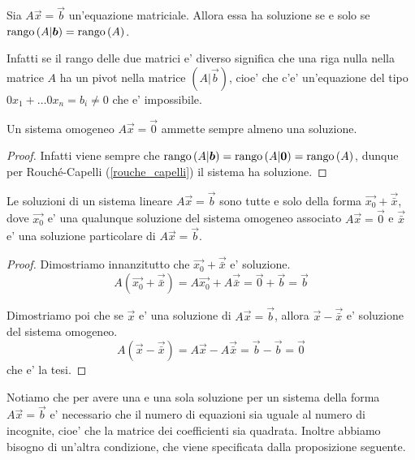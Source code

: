 \begin{theorem} \label{rouche_capelli}
    Sia $A\vec{x} = \vec b$ un'equazione matriciale. Allora essa ha soluzione se e solo se $\operatorname{rango}\left( A|\bm{b} \right) = \operatorname{rango}\left( A \right)$.
\end{theorem}
\begin{intuition}
    Infatti se il rango delle due matrici e' diverso significa che una riga nulla nella matrice $A$ ha un pivot nella matrice $(A|\vec b)$, cioe' che c'e' un'equazione del tipo $0x_1 + \dots 0x_n = b_i \neq 0$ che e' impossibile.
\end{intuition}

\begin{proposition}
    Un sistema omogeneo $A\vec{x} = \vec 0$ ammette sempre almeno una soluzione.
\end{proposition}
\begin{proof}
    Infatti viene sempre che $\operatorname{rango}\left( A|\bm{b} \right) = \operatorname{rango}\left( A|\bm{0} \right) = \operatorname{rango}\left( A \right)$, dunque per Rouché-Capelli (\ref{rouche_capelli}) il sistema ha soluzione.
\end{proof}

\begin{proposition}
    Le soluzioni di un sistema lineare $A\vec x = \vec b$ sono tutte e solo della forma $\vec{x_0} + \vec{\bar{x}}$, dove $\vec{x_0}$ e' una qualunque soluzione del sistema omogeneo associato $A\vec x = \vec 0$ e $\vec{\bar{x}}$ e' una soluzione particolare di $A\vec x = \vec b$.
\end{proposition}
\begin{proof}
    Dimostriamo innanzitutto che $\vec{x_0} + \vec{\bar{x}}$ e' soluzione.
    \[A(\vec{x_0} + \vec{\bar{x}}) = A\vec{x_0} + A\vec{\bar{x}} = \vec 0 + \vec b = \vec b\]

    Dimostriamo poi che se $\vec x$ e' una soluzione di $A\vec x = \vec b$, allora $\vec x - \vec{\bar x}$ e' soluzione del sistema omogeneo.
    \[A(\vec{x} - \vec{\bar{x}}) = A\vec{x} - A\vec{\bar{x}} = \vec b - \vec b = \vec 0\]
    che e' la tesi.
\end{proof}

Notiamo che per avere una e una sola soluzione per un sistema della forma $A\vec x = \vec b$ e' necessario che il numero di equazioni sia uguale al numero di incognite, cioe' che la matrice dei coefficienti sia quadrata. Inoltre abbiamo bisogno di un'altra condizione, che viene specificata dalla proposizione seguente.

